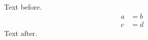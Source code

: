 \documentclass{article}
\begin{document}
Text before.
\begin{align}
\label{eq:a}
a&=b\\
c&=d
\end{align}
Text after.
\end{document}
